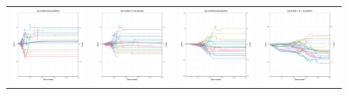 \begin{figure}
\begin{tabular}{cccc}
\hspace{-0.5cm}\includegraphics[width = 1.55in]{images/Visualizations/GAvsANN/2000ms5x5.png} &
\hspace{-0.5cm}\includegraphics[width = 1.55in]{images/Visualizations/GAvsANN/2000ms7x7.png} &
\hspace{-0.5cm}\includegraphics[width = 1.55in]{images/Visualizations/GAvsANN/2000ms9x9.png} &
\hspace{-0.5cm}\includegraphics[width = 1.55in]{images/Visualizations/GAvsANN/2000ms11x11.png} \\


\end{tabular}
\end{figure}
